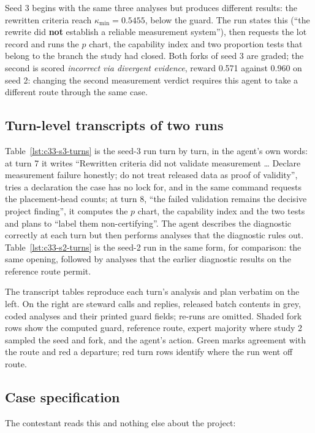 \documentclass{article}
\begin{document}
Seed 3 begins with the same three analyses but produces different results: the
rewritten criteria reach $\kappa_{\min} = 0.5455$, below the guard. The run states this
(``the rewrite did \textbf{not} establish a reliable measurement system''), then requests
the lot record and runs the $p$ chart, the capability index and two proportion tests
that belong to the branch the study had closed. Both forks of seed 3 are graded; the
second is scored \emph{incorrect via divergent evidence}, reward 0.571 against 0.960 on
seed 2: changing the second measurement verdict requires this agent to take a different route through the same case.

\subsection{Turn-level transcripts of two runs}

Table~\ref{lst:c33-s3-turns} is the seed-3 run turn by turn, in the agent's own words:
at turn 7 it writes ``Rewritten criteria did not validate measurement \ldots{} Declare
measurement failure honestly; do not treat released data as proof of validity'', tries a
declaration the case has no lock for, and in the same command requests the placement-head
counts; at turn 8, ``the failed validation remains the decisive project finding'', it
computes the $p$ chart, the capability index and the two tests and plans to ``label them
non-certifying''. The agent describes the diagnostic correctly at each turn but then performs analyses that the diagnostic rules out. Table~\ref{lst:c33-s2-turns} is the seed-2 run in the same form,
for comparison: the same opening, followed by analyses that the earlier diagnostic results on the reference route permit.

The transcript tables reproduce each turn's analysis and plan verbatim on the left. On the right are steward calls and replies, released batch contents in grey, coded analyses and their printed guard fields; re-runs are omitted. Shaded fork rows show the computed guard, reference route, expert majority where study 2 sampled the seed and fork, and the agent's action. Green marks agreement with the route and red a departure; red turn rows identify where the run went off route.

\FloatBarrier


\subsection{Case specification}
\noindent
The contestant reads this and nothing else about the project:
\end{document}

